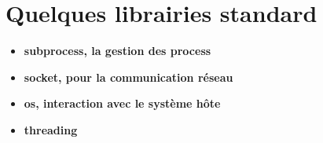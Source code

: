 \section{Quelques librairies standard}
\begin{frame}[fragile]
  \begin{itemize}
    \item<1-> \bf{subprocess}, la gestion des process
    \item<2-> \bf{socket}, pour la communication réseau
    \item<3-> \bf{os}, interaction avec le système hôte
    \item<4-> \bf{threading}
  \end{itemize}
\end{frame}
